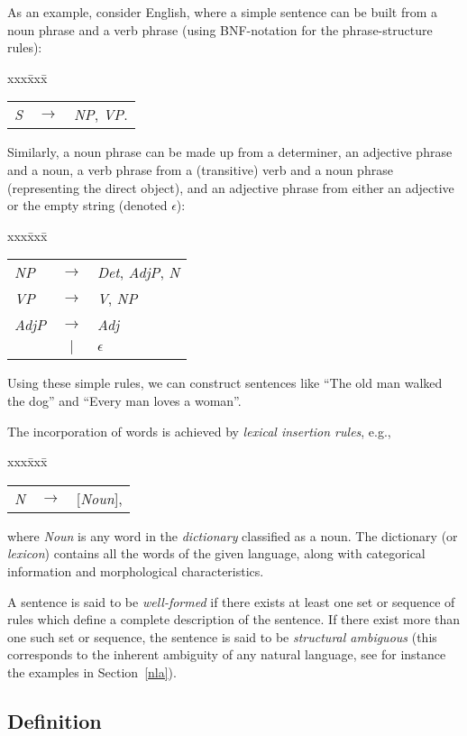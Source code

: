 As an example, consider English, where a simple sentence can be built
from a noun phrase and a verb phrase (using BNF-notation for the
phrase-structure rules):
\begin{tabbing}
  xxx\= xxx\= \kill \>\>\begin{tabular}{lcl} {\sl S\/} &
  $\rightarrow$ & {\sl NP\/}, {\sl VP\/}.
\end{tabular}  
\end{tabbing}
Similarly, a noun phrase can be made up from a determiner, an adjective
phrase and a noun, a verb phrase from a (transitive) verb and a noun
phrase (representing the direct object), and an adjective phrase from
either an adjective or the empty string (denoted $\epsilon$):
\begin{tabbing}
  xxx\= xxx\= \kill \>\>\begin{tabular}{lcl} {\sl NP\/} &
  $\rightarrow$ & {\sl Det\/}, {\sl AdjP\/}, {\sl N\/} \\ {\sl VP\/} &
  $\rightarrow$ & {\sl V\/}, {\sl NP\/} \\ {\sl AdjP\/} &
  $\rightarrow$ & {\sl Adj\/} \\ & $|$ & $\epsilon$
\end{tabular}
\end{tabbing}
Using these simple rules, we can construct sentences like ``The old man
walked the dog'' and ``Every man loves a woman''.

The incorporation of words is achieved by {\em lexical insertion
rules\/}, e.g.,
\begin{tabbing}
  xxx\= xxx\= \kill \>\>\begin{tabular}{lcl} {\sl N\/} &
  $\rightarrow$ & [{\sl Noun\/}],
\end{tabular}  
\end{tabbing}
where {\sl Noun\/} is any word in the {\em dictionary\/} classified as a
noun. The dictionary (or {\em lexicon\/}) contains all the words of the
given language, along with categorical information and morphological
characteristics.

A sentence is said to be {\em well-formed\/} if there exists at least
one set or sequence of rules which define a complete description of
the sentence. If there exist more than one such set or sequence, the
sentence is said to be {\em structural ambiguous\/} (this corresponds
to the inherent ambiguity of any natural language, see for instance
the examples in Section~\ref{nla}).

\subsection{Definition}
\label{naldef}

